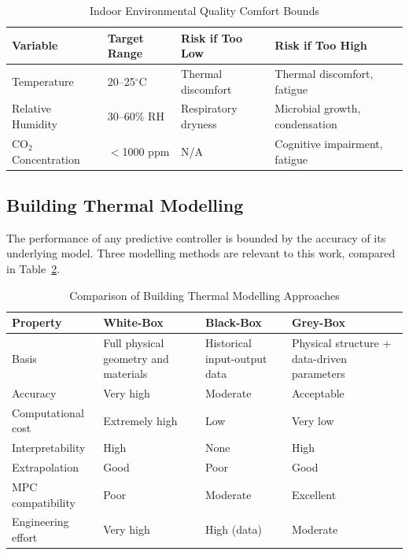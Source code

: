 \documentclass[12pt, a4paper]{article}
\begin{document}
	\begin{table}[h]
		\centering
		\caption{Indoor Environmental Quality Comfort Bounds}
		\label{tab:iaq_bounds}
		\begin{tabular}{llll}
			\toprule
			\textbf{Variable} & \textbf{Target Range} & \textbf{Risk if Too Low} & \textbf{Risk if Too High} \\
			\midrule
			Temperature  & 20--25$^\circ$C & Thermal discomfort & Thermal discomfort, fatigue \\
			Relative Humidity & 30--60\% RH & Respiratory dryness & Microbial growth, condensation \\
			CO$_2$ Concentration & $<$1000 ppm & N/A & Cognitive impairment, fatigue \\
			\bottomrule
		\end{tabular}
	\end{table}
	
	
	\subsection{Building Thermal Modelling}
	
	The performance of any predictive controller is bounded by the accuracy of its underlying model. Three modelling methods are relevant to this work, compared in Table~\ref{tab:modelling_paradigms}.
	
	\begin{table}[h]
		\centering
		\caption{Comparison of Building Thermal Modelling Approaches}
		\label{tab:modelling_paradigms}
		\begin{tabular}{lp{3.5cm}p{3.5cm}p{3.5cm}}
			\toprule
			\textbf{Property} & \textbf{White-Box} & \textbf{Black-Box} & \textbf{Grey-Box } \\
			\midrule
			Basis & Full physical geometry and materials & Historical input-output data & Physical structure + data-driven parameters \\
			Accuracy & Very high & Moderate & Acceptable \\
			Computational cost & Extremely high & Low & Very low \\
			Interpretability & High & None & High \\
			Extrapolation & Good & Poor & Good \\
			MPC compatibility & Poor & Moderate & Excellent \\
			Engineering effort & Very high & High (data) & Moderate \\
			\bottomrule
		\end{tabular}
	\end{table}
	
\end{document}
